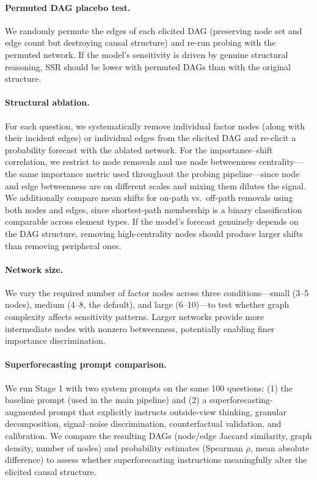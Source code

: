 \documentclass[11pt]{article}
\begin{document}
\paragraph{Permuted DAG placebo test.} We randomly permute the edges of each elicited DAG (preserving node set and edge count but destroying causal structure) and re-run probing with the permuted network. If the model's sensitivity is driven by genuine structural reasoning, SSR should be lower with permuted DAGs than with the original structure.

\paragraph{Structural ablation.} For each question, we systematically remove individual factor nodes (along with their incident edges) or individual edges from the elicited DAG and re-elicit a probability forecast with the ablated network. For the importance--shift correlation, we restrict to node removals and use node betweenness centrality---the same importance metric used throughout the probing pipeline---since node and edge betweenness are on different scales and mixing them dilutes the signal. We additionally compare mean shifts for on-path vs.\ off-path removals using both nodes and edges, since shortest-path membership is a binary classification comparable across element types. If the model's forecast genuinely depends on the DAG structure, removing high-centrality nodes should produce larger shifts than removing peripheral ones.

\paragraph{Network size.} We vary the required number of factor nodes across three conditions---small (3--5 nodes), medium (4--8, the default), and large (6--10)---to test whether graph complexity affects sensitivity patterns. Larger networks provide more intermediate nodes with nonzero betweenness, potentially enabling finer importance discrimination.

\paragraph{Superforecasting prompt comparison.} We run Stage 1 with two system prompts on the same 100 questions: (1) the baseline prompt (used in the main pipeline) and (2) a superforecasting-augmented prompt that explicitly instructs outside-view thinking, granular decomposition, signal--noise discrimination, counterfactual validation, and calibration. We compare the resulting DAGs (node/edge Jaccard similarity, graph density, number of nodes) and probability estimates (Spearman $\rho$, mean absolute difference) to assess whether superforecasting instructions meaningfully alter the elicited causal structure.
\end{document}
